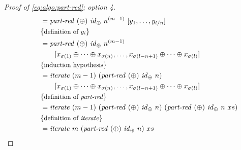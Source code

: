 \begin{proof}[Proof of \autoref{eq:algo:part-red}; option 4]
\begin{align*}
    &\qquad = \partRed\ (\oplus)\ \id_\oplus\ n^{(m-1)}\ [y_1, \ldots, y_{l/n}]\\
    &\qquad \comment{definition of $y_i$}\\
    &\qquad = \partRed\ (\oplus)\ \id_\oplus\ n^{(m-1)}\\
    &\qquad\qquad [x_{\sigma(1)} \oplus \dots \oplus x_{\sigma(n)}, \ldots, x_{\sigma(l-n+1)} \oplus \dots \oplus x_{\sigma(l)}]\\
    &\qquad \comment{induction hypothesis}\\
    &\qquad = \iterateN\ (m-1)\ (\partRed\ (\oplus)\ \id_\oplus\ n)\\
    &\qquad\qquad [x_{\sigma(1)} \oplus \dots \oplus x_{\sigma(n)}, \ldots, x_{\sigma(l-n+1)} \oplus \dots \oplus x_{\sigma(l)}]\\
    &\qquad \comment{definition of \partRed}\\
    &\qquad = \iterateN\ (m-1)\ (\partRed\ (\oplus)\ \id_\oplus\ n)\ (\partRed\ (\oplus)\ \id_\oplus\ n\ xs)\\
    &\qquad \comment{definition of \iterateN}\\
    &\qquad = \iterateN\ m\ (\partRed\ (\oplus)\ \id_\oplus\ n)\ xs
  \end{align*}


\end{proof}
